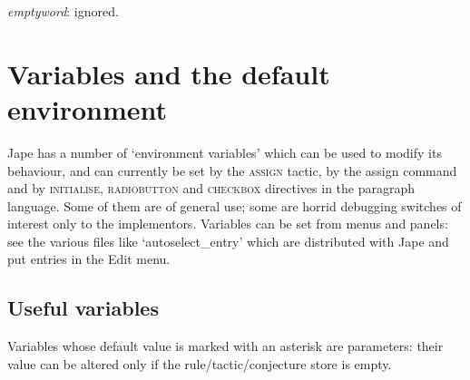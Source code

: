 \textit{emptyword}: ignored.


\section{Variables and the default environment}


Jape has a number of `environment variables' which can be used to modify its behaviour, and can currently be set by the \textsc{assign} tactic, by the assign command and by \textsc{initialise, radiobutton} and \textsc{checkbox} directives in the paragraph language. Some of them are of general use; some are horrid debugging switches of interest only to the implementors. Variables can be set from menus and panels: see the various files like `autoselect\_entry' which are distributed with Jape and put entries in the Edit menu.


\subsection{Useful variables}


Variables whose default value is marked with an asterisk are parameters: their value can be altered only if the rule/tactic/conjecture store is empty.



